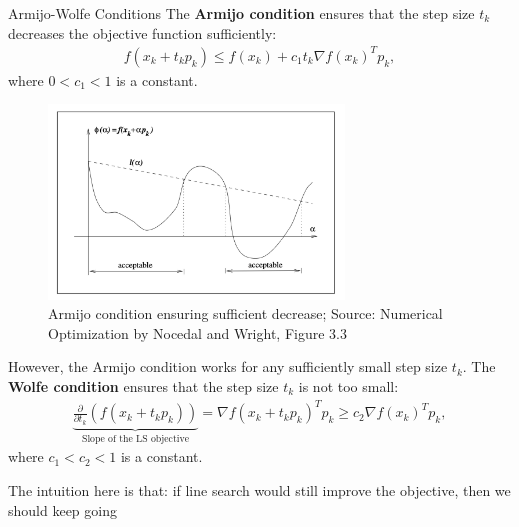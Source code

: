 \documentclass{beamer}
\begin{document}
\begin{frame}{Armijo-Wolfe Conditions}
     {
        The \textbf{Armijo condition} ensures that
        the step size $t_k$ decreases the objective function
        sufficiently:
        \begin{align*}
            f(x_k + t_k p_k) \le f(x_k) + c_1 t_k \nabla f(x_k)^T p_k,
        \end{align*}
        where $0 < c_1 < 1$ is a constant.
    }
     {
        \begin{figure}
            \centering
            \includegraphics[width=0.7\textwidth]{plots/armijo_condition.png}
            \caption{Armijo condition ensuring sufficient decrease;
                Source: Numerical Optimization by Nocedal and Wright,
                Figure 3.3
            }
            \label{fig:armijo_condition}
        \end{figure}
    }
     {
        However, the Armijo condition works for any sufficiently
        small step size $t_k$.
    }
     {
        The \textbf{Wolfe condition} ensures that
        the step size $t_k$ is not too small:
        \begin{align*}
            \underbrace{
            \frac{\partial}{\partial t_k} (
            f(x_k + t_k p_k)
            )
            }_{
            \text{Slope of the LS objective}
            }
            =
            \nabla f(x_k + t_k p_k)^T p_k \ge c_2 \nabla f(x_k)^T p_k,
        \end{align*}
        where $c_1 < c_2 < 1$ is a constant.
    }

     {
        The intuition here is that:
        if line search would still improve the objective,
        then we should keep going
    }


\end{frame}
\end{document}
